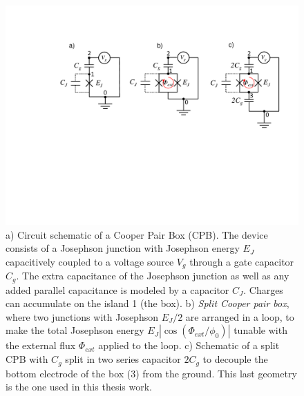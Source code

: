 \begin{figure}
	\centering
	\includegraphics[width=\textwidth]{"./material/figures/introduction/cooper_pair_box"}
	\caption{a) Circuit schematic of a Cooper Pair Box (CPB). The device consists of a Josephson junction with Josephson  energy $E_J$ capacitively coupled to a voltage source $V_g$ through a gate capacitor $C_g$. The extra capacitance of the Josephson junction as well as any added parallel capacitance is modeled by a capacitor $C_J$. Charges can accumulate on the island 1 (the box). b) {\it Split Cooper pair box}, where two junctions with Josephson $E_J/2$  are arranged in a loop, to make the total Josephson energy  $E_J |\cos(\Phi_{ext}/\phi_0)|$ tunable with the external flux $\Phi_{ext}$ applied to the loop. c) Schematic of a split CPB with $C_g$ split in two series capacitor $2 C_g$  to decouple the bottom electrode of the box (3) from the ground. This last geometry is the one used in this thesis work.}
	\label{fig:cpb_circuit}
\end{figure}

